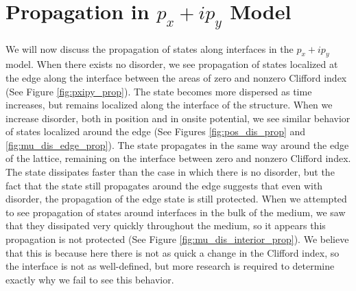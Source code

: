 \documentclass[a4paper]{article}
\begin{document}
\section{Propagation in \texorpdfstring{$p_x + ip_y$}{px + ipy} Model}

We will now discuss the propagation of states along interfaces in the $p_x + ip_y$ model.
When there exists no disorder, we see propagation of states localized at the edge along the interface between the areas of zero and nonzero Clifford index (See Figure \ref{fig:pxipy_prop}).
The state becomes more dispersed as time increases, but remains localized along the interface of the structure. 
When we increase disorder, both in position and in onsite potential, we see similar behavior of states localized around the edge (See Figures \ref{fig:pos_dis_prop} and \ref{fig:mu_dis_edge_prop}).
The state propagates in the same way around the edge of the lattice, remaining on the interface between zero and nonzero Clifford index.
The state dissipates faster than the case in which there is no disorder, but the fact that the state still propagates around the edge suggests that even with disorder, the propagation of the edge state is still protected.
When we attempted to see propagation of states around interfaces in the bulk of the medium, we saw that they dissipated very quickly throughout the medium, so it appears this propagation is not protected (See Figure \ref{fig:mu_dis_interior_prop}).
We believe that this is because here there is not as quick a change in the Clifford index, so the interface is not as well-defined, but more research is required to determine exactly why we fail to see this behavior.
\end{document}
